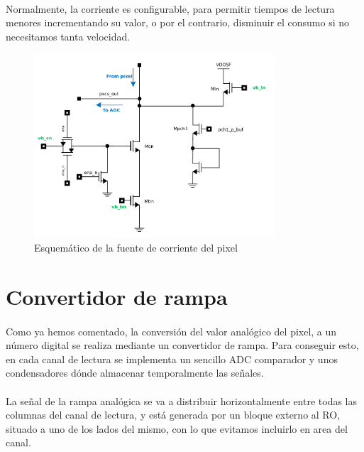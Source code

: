 \paragraph{}
Normalmente, la corriente es configurable, para permitir tiempos de lectura menores
incrementando su  valor, o por el contrario, disminuir el consumo si no necesitamos tanta
velocidad.

\begin{figure}[h]
	\centering
	\includegraphics[width=0.8\textwidth]{svg/pxcs_sch.pdf}
	\caption{Esquemático de la fuente de corriente del pixel}
	\label{fig:pxcs_sch}
\end{figure}


\section{Convertidor de rampa}\label{cap:ro_sch_conv}

\paragraph{}
Como ya hemos comentado, la conversión del valor analógico del pixel, a un número
digital se realiza mediante un convertidor de rampa. Para conseguir esto,
en cada canal de lectura se implementa un sencillo ADC comparador y unos condensadores
dónde almacenar temporalmente las señales.

\paragraph{}
La señal de la rampa analógica se va a distribuir horizontalmente entre todas las
columnas del canal de lectura, y está generada por un bloque externo al RO, situado
a uno de los lados del mismo, con lo que evitamos incluirlo en area del canal.


